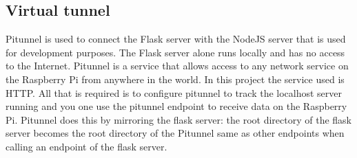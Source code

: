 \subsection{Virtual tunnel}
Pitunnel is used to connect the Flask server with the NodeJS server that is used for development purposes. The Flask server alone runs locally and has no access to the Internet. Pitunnel is a service that allows access to any network service on the Raspberry Pi from anywhere in the world. In this project the service used is \gls{HTTP}. All that is required is to configure pitunnel to track the localhost server running and you one use the pitunnel endpoint to receive data on the Raspberry Pi. Pitunnel does this by mirroring the flask server: the root directory of the flask server becomes the root directory of the Pitunnel same as other endpoints when calling an endpoint of the flask server.
